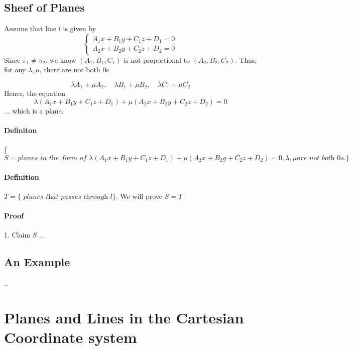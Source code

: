 \documentclass[11pt]{book}
\begin{document}
\subsection{Sheef of Planes}
Assume that line $l$ is given by 
$$
\left\{\begin{array}{l}
A_{1} x+B_{1} y+C_{1} z+D_{1}=0 \\
A_{2} x+B_{2} y+C_{2} z+D_{2}=0
\end{array}\right.
$$
 Since $\pi_1 \neq \pi_2$, we know $(A_1,B_1,C_1)$ is not proportional to $(A_2,B_2,C_2)$. Thus, for any $\lambda, \mu$, there are not both $0$s
 
 $$
 \lambda A_{1}+\mu A_{2}, \quad \lambda B_{1}+\mu B_{2}, \quad \lambda C_{1}+\mu C_{2}
 $$
 Hence, the equation 
 $$
 \lambda\left(A_{1} x+B_{1} y+C_{1} z+D_{1}\right)+\mu\left(A_{2} x+B_{2} y+C_{2} z+D_{2}\right)=0
 $$ ...
 which is a plane.
 
\paragraph{Definiton} \{$S=\textit{planes in the form of }  \lambda\left(A_{1} x+B_{1} y+C_{1} z+D_{1}\right)+\mu\left(A_{2} x+B_{2} y+C_{2} z+D_{2}\right)=0, \lambda, \mu \textit{are not both 0s.}\}$
 
 \paragraph{Definition}$T = \{\textit{ planes that passes through }l\}$. We will prove $S=T$
 \paragraph{Proof}
 1. Claim $S$ ...
 
 \subsection{An Example}..
 
 \section{Planes and Lines in the Cartesian Coordinate system}
 
\end{document}
